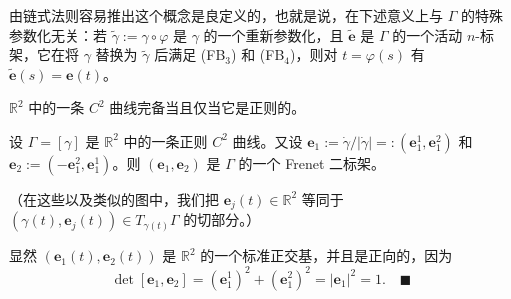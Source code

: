 \begin{remark}

\begin{items}
\item

由链式法则容易推出这个概念是良定义的，也就是说，在下述意义上与 $ \Gamma $ 的特殊参数化无关：若 $ \tilde\gamma := \gamma \circ \varphi $ 是 $ \gamma $ 的一个重新参数化，且 $ \tilde{\mathbf{e}} $ 是 $ \Gamma $ 的一个活动 $ n $-标架，它在将 $ \gamma $ 替换为 $ \tilde\gamma $ 后满足 (FB$ {}_{3} $) 和 (FB$ {}_{4} $)，则对 $ t = \varphi(s) $ 有 $ \tilde{\mathbf{e}}(s) = \mathbf{e}(t) $。

\item

$ \mathbb{R}^2 $ 中的一条 $ C^2 $ 曲线完备当且仅当它是正则的。

\item

设 $ \Gamma = [\gamma] $ 是 $ \mathbb{R}^2 $ 中的一条正则 $ C^2 $ 曲线。又设 $ \mathbf{e}_1 := \dot\gamma/|\dot\gamma| =: (\mathbf{e}_1^1, \mathbf{e}_1^2) $ 和 $ \mathbf{e}_2 := (-\mathbf{e}_1^2, \mathbf{e}_1^1) $。则 $ (\mathbf{e}_1, \mathbf{e}_2) $ 是 $ \Gamma $ 的一个 Frenet 二标架。

\end{items}


（在这些以及类似的图中，我们把 $ \mathbf{e}_j(t) \in \mathbb{R}^2 $ 等同于 $ (\gamma(t), \mathbf{e}_j(t)) \in T_{\gamma(t)}\Gamma $ 的切部分。）

\proofhead
显然 $ (\mathbf{e}_1(t), \mathbf{e}_2(t)) $ 是 $ \mathbb{R}^2 $ 的一个标准正交基，并且是正向的，因为
\[
\det[\mathbf{e}_1, \mathbf{e}_2] = (\mathbf{e}_1^1)^2 + (\mathbf{e}_1^2)^2 = |\mathbf{e}_1|^2 = 1 .\quad\blacksquare
\]
\end{remark}

